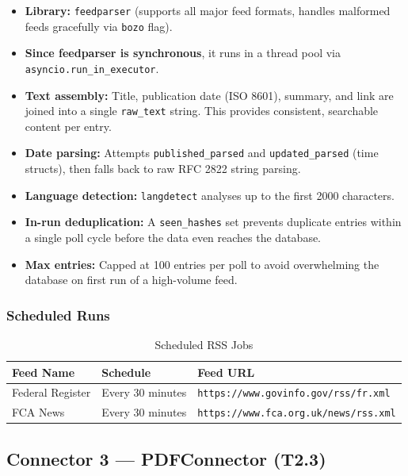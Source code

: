\documentclass[12pt,a4paper]{article}
\begin{document}
\begin{itemize}[noitemsep]
  \item \textbf{Library:} \texttt{feedparser} (supports all major feed formats, handles malformed feeds gracefully via \texttt{bozo} flag).
  \item \textbf{Since feedparser is synchronous}, it runs in a thread pool via \texttt{asyncio.run\_in\_executor}.
  \item \textbf{Text assembly:} Title, publication date (ISO 8601), summary, and link are joined into a single \texttt{raw\_text} string. This provides consistent, searchable content per entry.
  \item \textbf{Date parsing:} Attempts \texttt{published\_parsed} and \texttt{updated\_parsed} (time structs), then falls back to raw RFC 2822 string parsing.
  \item \textbf{Language detection:} \texttt{langdetect} analyses up to the first 2000 characters.
  \item \textbf{In-run deduplication:} A \texttt{seen\_hashes} set prevents duplicate entries within a single poll cycle before the data even reaches the database.
  \item \textbf{Max entries:} Capped at 100 entries per poll to avoid overwhelming the database on first run of a high-volume feed.
\end{itemize}

\subsubsection{Scheduled Runs}

\begin{table}[H]
\centering
\caption{Scheduled RSS Jobs}\label{tab:rssschedule}
\begin{tabularx}{\textwidth}{@{}l l l@{}}
\toprule
\textbf{Feed Name} & \textbf{Schedule} & \textbf{Feed URL} \\
\midrule
Federal Register & Every 30 minutes & \texttt{https://www.govinfo.gov/rss/fr.xml} \\
FCA News         & Every 30 minutes & \texttt{https://www.fca.org.uk/news/rss.xml} \\
\bottomrule
\end{tabularx}
\end{table}

\subsection{Connector 3 — PDFConnector (T2.3)}
\end{document}
